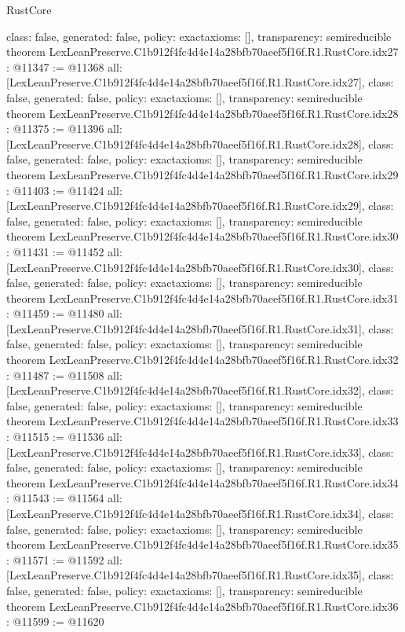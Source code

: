 \begin{lexlean}{RustCore}
\begin{coremodule}
{  class: false,
  generated: false,
  policy: exact{axioms: []},
  transparency: semireducible
}
theorem LexLeanPreserve.C1b912f4fc4d4e14a28bfb70aeef5f16f.R1.RustCore.idx27 : @11347 := @11368 {
  all: [LexLeanPreserve.C1b912f4fc4d4e14a28bfb70aeef5f16f.R1.RustCore.idx27],
  class: false,
  generated: false,
  policy: exact{axioms: []},
  transparency: semireducible
}
theorem LexLeanPreserve.C1b912f4fc4d4e14a28bfb70aeef5f16f.R1.RustCore.idx28 : @11375 := @11396 {
  all: [LexLeanPreserve.C1b912f4fc4d4e14a28bfb70aeef5f16f.R1.RustCore.idx28],
  class: false,
  generated: false,
  policy: exact{axioms: []},
  transparency: semireducible
}
theorem LexLeanPreserve.C1b912f4fc4d4e14a28bfb70aeef5f16f.R1.RustCore.idx29 : @11403 := @11424 {
  all: [LexLeanPreserve.C1b912f4fc4d4e14a28bfb70aeef5f16f.R1.RustCore.idx29],
  class: false,
  generated: false,
  policy: exact{axioms: []},
  transparency: semireducible
}
theorem LexLeanPreserve.C1b912f4fc4d4e14a28bfb70aeef5f16f.R1.RustCore.idx30 : @11431 := @11452 {
  all: [LexLeanPreserve.C1b912f4fc4d4e14a28bfb70aeef5f16f.R1.RustCore.idx30],
  class: false,
  generated: false,
  policy: exact{axioms: []},
  transparency: semireducible
}
theorem LexLeanPreserve.C1b912f4fc4d4e14a28bfb70aeef5f16f.R1.RustCore.idx31 : @11459 := @11480 {
  all: [LexLeanPreserve.C1b912f4fc4d4e14a28bfb70aeef5f16f.R1.RustCore.idx31],
  class: false,
  generated: false,
  policy: exact{axioms: []},
  transparency: semireducible
}
theorem LexLeanPreserve.C1b912f4fc4d4e14a28bfb70aeef5f16f.R1.RustCore.idx32 : @11487 := @11508 {
  all: [LexLeanPreserve.C1b912f4fc4d4e14a28bfb70aeef5f16f.R1.RustCore.idx32],
  class: false,
  generated: false,
  policy: exact{axioms: []},
  transparency: semireducible
}
theorem LexLeanPreserve.C1b912f4fc4d4e14a28bfb70aeef5f16f.R1.RustCore.idx33 : @11515 := @11536 {
  all: [LexLeanPreserve.C1b912f4fc4d4e14a28bfb70aeef5f16f.R1.RustCore.idx33],
  class: false,
  generated: false,
  policy: exact{axioms: []},
  transparency: semireducible
}
theorem LexLeanPreserve.C1b912f4fc4d4e14a28bfb70aeef5f16f.R1.RustCore.idx34 : @11543 := @11564 {
  all: [LexLeanPreserve.C1b912f4fc4d4e14a28bfb70aeef5f16f.R1.RustCore.idx34],
  class: false,
  generated: false,
  policy: exact{axioms: []},
  transparency: semireducible
}
theorem LexLeanPreserve.C1b912f4fc4d4e14a28bfb70aeef5f16f.R1.RustCore.idx35 : @11571 := @11592 {
  all: [LexLeanPreserve.C1b912f4fc4d4e14a28bfb70aeef5f16f.R1.RustCore.idx35],
  class: false,
  generated: false,
  policy: exact{axioms: []},
  transparency: semireducible
}
theorem LexLeanPreserve.C1b912f4fc4d4e14a28bfb70aeef5f16f.R1.RustCore.idx36 : @11599 := @11620 {
}
\end{coremodule}
\end{lexlean}
